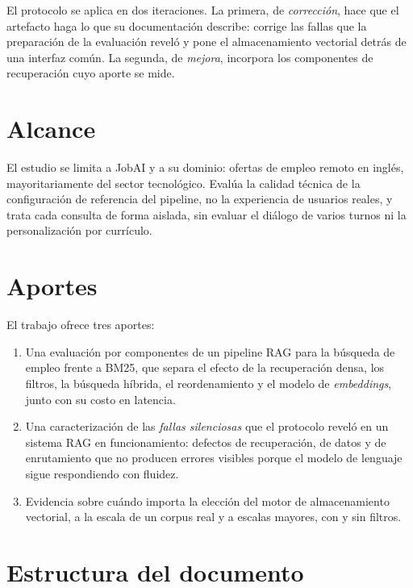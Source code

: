 El protocolo se aplica en dos iteraciones. La primera, de \emph{corrección}, hace que el artefacto haga lo que su documentación describe: corrige las fallas que la preparación de la evaluación reveló y pone el almacenamiento vectorial detrás de una interfaz común. La segunda, de \emph{mejora}, incorpora los componentes de recuperación cuyo aporte se mide.

\section*{Alcance}

El estudio se limita a JobAI y a su dominio: ofertas de empleo remoto en inglés, mayoritariamente del sector tecnológico. Evalúa la calidad técnica de la configuración de referencia del pipeline, no la experiencia de usuarios reales, y trata cada consulta de forma aislada, sin evaluar el diálogo de varios turnos ni la personalización por currículo.

\section*{Aportes}

El trabajo ofrece tres aportes:
\begin{enumerate}
    \item Una evaluación por componentes de un pipeline RAG para la búsqueda de empleo frente a BM25, que separa el efecto de la recuperación densa, los filtros, la búsqueda híbrida, el reordenamiento y el modelo de \textit{embeddings}, junto con su costo en latencia.
    \item Una caracterización de las \emph{fallas silenciosas} que el protocolo reveló en un sistema RAG en funcionamiento: defectos de recuperación, de datos y de enrutamiento que no producen errores visibles porque el modelo de lenguaje sigue respondiendo con fluidez.
    \item Evidencia sobre cuándo importa la elección del motor de almacenamiento vectorial, a la escala de un corpus real y a escalas mayores, con y sin filtros.
\end{enumerate}

\section*{Estructura del documento}


